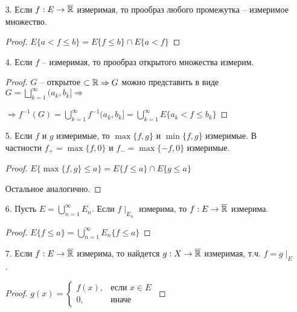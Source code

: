 \begin{enumerate}
    \item[3.] Если $f:E\rightarrow \overline{\mathbb{R}}$ измеримая, то прообраз любого 
    промежутка – измеримое множество.

    \begin{proof}
        $E\{a < f \leq b\}=E\{f \leq b\}\cap E\{a < f\}$
    \end{proof}

    \item[4.] Если $f$ – измеримая, то прообраз открытого множества измерим.
    \begin{proof}
        $G$ – открытое $\subset \mathbb{R}\Rightarrow G$ можно представить в виде $ G = \bigsqcup\limits_{k=1}^\infty (a_k, b_k]\Rightarrow$
        
        $\Rightarrow f^{-1}(G)=\bigcup\limits_{k=1}^\infty f^{-1}(a_k, b_k]=\bigcup\limits_{k=1}^\infty E\{a_k < f \leq b_k\}$
    \end{proof}

    \item[5.] Если $f$ и $g$ измеримые, то $\max\{f, g\}$ и $\min\{f, g\}$ измеримые. 
    В частности $f_+=\max\{f, 0\}$ и $f_-=\max\{-f, 0\}$ измеримые.

    \begin{proof}
        $E\{\max\{f, g\} \leq a\}=E\{f \leq a\}\cap E\{g \leq a\}$

        Остальное аналогично.
    \end{proof}

    \item[6.] Пусть $E=\bigcup\limits_{n=1}^\infty E_n$. Если $f\mid_{E_n}$ измерима, то $f:E\rightarrow \overline{\mathbb{R}}$ измерима.
    
    \begin{proof}
        $E\{f\leq a\}=\bigcup\limits_{n=1}^\infty  E_n\{f\leq a\}$
    \end{proof}

    \item[7.] Если $f:E\rightarrow \overline{\mathbb{R}}$ измерима, то найдется $g:X\rightarrow\overline{\mathbb{R}}$ измеримая, 
    т.ч. $f=g\mid_E$.

    \begin{proof}
        $g(x)=\left\{ \begin{array}{ll}
            f(x), & \text{если } x\in E \\
            0, & \text{иначе}
        \end{array}\right.$
    \end{proof}
\end{enumerate}

